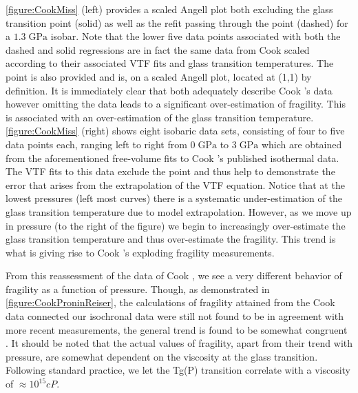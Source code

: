 	\fig \nolinebreak \ref{figure:CookMiss} (left) provides a scaled Angell plot both excluding the \tgp glass transition point (solid) as well as the refit passing through the \tgp point (dashed) for a $1.3\;\si{\giga\pascal}$ isobar.  Note that the lower five data points associated with both the dashed and solid regressions are in fact the same data from Cook \etal\textemdash scaled according to their associated VTF fits and glass transition temperatures.  The \tgp point is also provided and is, on a scaled Angell plot, located at (1,1) by definition.  It is immediately clear that both adequately describe Cook \etal's data however omitting the \tgp data leads to a significant over-estimation of fragility.  This is associated with an over-estimation of the glass transition temperature.  \fig \nolinebreak\ref{figure:CookMiss} (right) shows eight isobaric data sets, consisting of four to five data points each, ranging left to right from $0\;\si{\giga\pascal}$ to $3\;\si{\giga\pascal}$ which are obtained from the aforementioned free-volume fits to Cook \etal's published isothermal data.  The VTF fits to this data exclude the \tgp point and thus help to demonstrate the error that arises from the extrapolation of the VTF equation.  Notice that at the lowest pressures (left most curves) there is a systematic under-estimation of the glass transition temperature due to model extrapolation.  However, as we move up in pressure (to the right of the figure) we begin to increasingly over-estimate the glass transition temperature and thus over-estimate the fragility.  This trend is what is giving rise to Cook \etal's exploding fragility measurements.

From this reassessment of the data of Cook \etal, we see a very different behavior of fragility as a function of pressure.  Though, as demonstrated in \fig \nolinebreak \ref{figure:CookProninReiser}, the calculations of fragility attained from the Cook \etal data connected \via our \tgp isochronal data were still not found to be in agreement with more recent measurements, the general trend is found to be somewhat congruent \nolinebreak\cite{Pronin,Reiser}.  It should be noted that the actual values of fragility, apart from their trend with pressure, are somewhat dependent on the viscosity at the glass transition.  Following standard practice, we let the Tg(P) transition correlate with a viscosity of $\approx 10^{15}cP$.  

